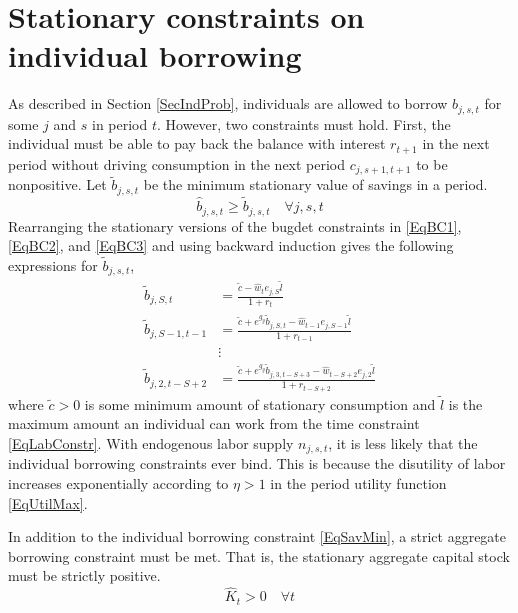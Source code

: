 \documentclass[letterpaper,12pt]{article}
\theoremstyle{definition}
\begin{document}
\section{Stationary constraints on individual borrowing}\label{AppBorConstr}

  \setcounter{equation}{0}

  As described in Section \ref{SecIndProb}, individuals are allowed to borrow $b_{j,s,t}$ for some $j$ and $s$ in period $t$. However, two constraints must hold. First, the individual must be able to pay back the balance with interest $r_{t+1}$ in the next period without driving consumption in the next period $c_{j,s+1,t+1}$ to be nonpositive. Let $\tilde{b}_{j,s,t}$ be the minimum stationary value of savings in a period.
  \begin{equation}\label{EqSavMin}
    \hat{b}_{j,s,t}\geq\tilde{b}_{j,s,t} \quad\forall j,s,t
  \end{equation}
  Rearranging the stationary versions of the bugdet constraints in \eqref{EqBC1}, \eqref{EqBC2}, and \eqref{EqBC3} and using backward induction gives the following expressions for $\tilde{b}_{j,s,t}$,
  \begin{equation}\label{EqBorConsts}
    \begin{split}
      \tilde{b}_{j,S,t} &= \frac{\tilde{c} - \hat{w}_t e_{j,S}\tilde{l}}{1+r_t}  \\
      \tilde{b}_{j,S-1,t-1} &= \frac{\tilde{c} + e^{g_y}\tilde{b}_{j,S,t} - \hat{w}_{t-1}e_{j,S-1}\tilde{l}}{1+r_{t-1}} \\
      &\vdots \\
      \tilde{b}_{j,2,t-S+2} &= \frac{\tilde{c} + e^{g_y}\tilde{b}_{j,3,t-S+3} - \hat{w}_{t-S+2}e_{j,2}\tilde{l}}{1+r_{t-S+2}}
    \end{split}
  \end{equation}
  where $\tilde{c}>0$ is some minimum amount of stationary consumption and $\tilde{l}$ is the maximum amount an individual can work from the time constraint \eqref{EqLabConstr}. With endogenous labor supply $n_{j,s,t}$, it is less likely that the individual borrowing constraints ever bind. This is because the disutility of labor increases exponentially according to $\eta>1$ in the period utility function \eqref{EqUtilMax}.

  In addition to the individual borrowing constraint \eqref{EqSavMin}, a strict aggregate borrowing constraint must be met. That is, the stationary aggregate capital stock must be strictly positive.
  \begin{equation}\label{EqAggrCapConstr}
    \hat{K}_t > 0 \quad\forall t
  \end{equation}
\end{document}
